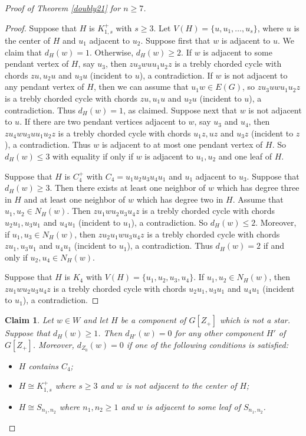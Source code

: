 \documentclass[12pt]{article}
\newtheorem {claim}{Claim}[section]
\begin{document}
\begin{proof}[Proof of Theorem \ref{doubly21} for $n\ge 7$]
\begin{proof}
Suppose that $H$ is $K_{1,s}^+$ with $s\ge 3$. Let $V(H)=\{u,u_1,\dots,u_{s}\}$, where $u$ is the center of $H$ and $u_1$ adjacent to $u_2$.
Suppose first that $w$ is adjacent to $u$.
We claim that $d_H(w)=1$. Otherwise,  $d_H(w)\ge 2$.
If $w$ is adjacent to some pendant vertex of $H$, say $u_3$, then $zu_3wuu_1u_2z$ is a trebly chorded cycle with  chords $zu, u_2u$ and $u_3u$ (incident to $u$), a contradiction.
If $w$ is not adjacent to any pendant vertex of $H$, then we can assume that $u_1w\in E(G)$, so $zu_3uwu_1u_2z$ is a trebly chorded cycle with  chords $zu, u_1u$ and $u_2u$ (incident to $u$), a contradiction. Thus $d_H(w)=1$, as claimed.
Suppose next that $w$ is not adjacent to $u$.
If there are two pendant vertices adjacent to $w$, say $u_3$ and $u_4$, then $zu_4wu_3uu_1u_2z$ is a trebly chorded cycle with  chords $u_1z, uz$ and $u_3z$ (incident to $z$), a contradiction. Thus $w$ is adjacent to at most one pendant vertex of $H$.
So $d_{H}(w)\le 3$ with equality if only if $w$ is adjacent to $u_1,u_2$ and one leaf of $H$.


Suppose that $H$ is $C_4^+$ with $C_4=u_1u_2u_3u_4u_1$ and $u_1$ adjacent to $u_3$.
Suppose that $d_{H}(w)\ge 3$. Then there exists at least one neighbor of $w$ which has degree three in $H$ and at least one neighbor of $w$ which has degree two in $H$. Assume that $u_1,u_2\in N_{H}(w)$.
Then $zu_1wu_2u_3u_4z$ is a trebly chorded cycle with  chords $u_2u_1, u_3u_1$ and $u_4u_1$ (incident to $u_1$), a contradiction.
So $d_{H}(w)\le 2$.
Moreover, if $u_1,u_3\in N_{H}(w)$, then $zu_2u_1wu_3u_4z$ is a trebly chorded cycle with  chords $zu_1, u_3u_1$ and $u_4u_1$ (incident to $u_1$), a contradiction. Thus $d_{H}(w)= 2$ if and only if $u_2,u_4\in N_{H}(w)$.

Suppose that $H$ is $K_4$ with $V(H)=\{u_1,u_2,u_3,u_4\}$. If $u_1,u_2\in N_{H}(w)$, then $zu_1wu_2u_3u_4z$ is a trebly chorded cycle with  chords $u_2u_1, u_3u_1$ and $u_4u_1$ (incident to $u_1$), a contradiction.
\end{proof}

\begin{claim}\label{c2} Let $w\in W$ and let $H$ be a component of $G[Z_+]$ which is not a star. Suppose that $d_{H}(w)\ge 1$. Then $d_{H'}(w)=0$ for any other component $H'$ of $G[Z_+]$. Moreover, $d_{Z_0}(w)=0$ if one of the following conditions is satisfied:
\begin{itemize}
\item $H$ contains $C_4$;
\item $H\cong K_{1,s}^+$ where $s\ge 3$ and  $w$ is not adjacent to the center of $H$;
\item $H\cong S_{n_1,n_2}$ where $n_1,n_2\ge 1$ and $w$ is adjacent to some leaf of $S_{n_1,n_2}$.
\end{itemize}
\end{claim}


\end{proof}
\end{document}
